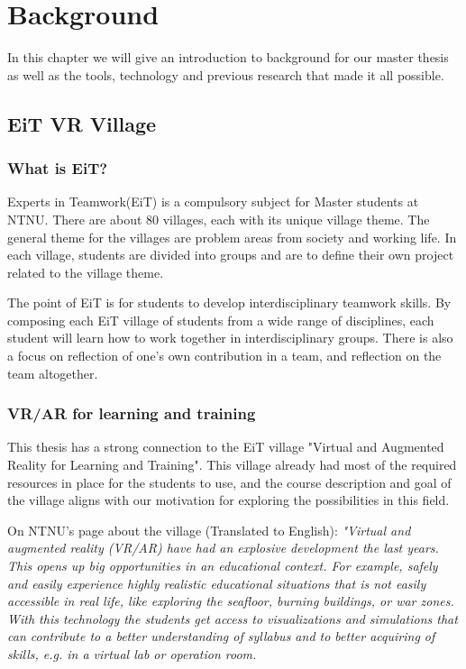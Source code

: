 \chapter{Background}
    \label{chap:background}
    In this chapter we will give an introduction to background for our master thesis as well as the tools, technology and previous research that made it all possible. 

    \section{EiT VR Village}
        \subsection{What is EiT?}
            Experts in Teamwork(EiT) is a compulsory subject for Master students at NTNU. There are about 80 villages, each with its unique village theme. The general theme for the villages are problem areas from society and working life. In each village, students are divided into groups and are to define their own project related to the village theme.\cite{EiTAbout}
            
            The point of EiT is for students to develop interdisciplinary teamwork skills. By composing each EiT village of students from a wide range of disciplines, each student will learn how to work together in interdisciplinary groups. There is also a focus on reflection of one's own contribution in a team, and reflection on the team altogether.\cite{EiTAbout}
        
        \subsection{VR/AR for learning and training}
            This thesis has a strong connection to the EiT village "Virtual and Augmented Reality for Learning and Training". This village already had most of the required resources in place for the students to use, and the course description and goal of the village aligns with our motivation for exploring the possibilities in this field.
            
            On NTNU's page about the village (Translated to English): \emph{"Virtual and augmented reality (VR/AR) have had an explosive development the last years. This opens up big opportunities in an educational context. For example, safely and easily experience highly realistic educational situations that is not easily accessible in real life, like exploring the seafloor, burning buildings, or war zones. With this technology the students get access to visualizations and simulations that can contribute to a better understanding of syllabus and to better acquiring of skills, e.g. in a virtual lab or operation room.}
            
